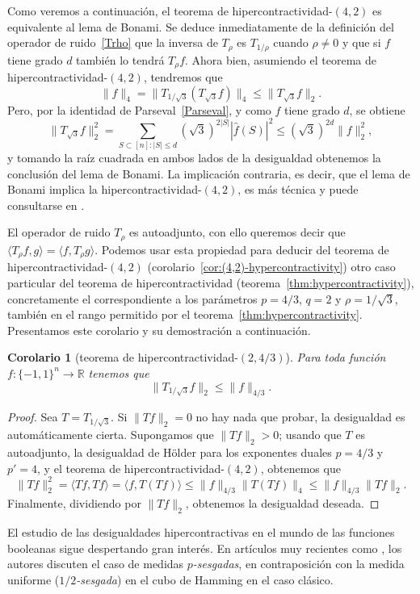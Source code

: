 \documentclass[autocontact]{gaceta}
\newcommand{\R}{\mathbb{R}}
\newtheorem{corollary}{Corolario}
\begin{document}
Como veremos a continuación, el teorema de hipercontractividad-$(4,2)$ es equivalente al lema de Bonami. Se deduce inmediatamente de la definición del operador de ruido~\eqref{Trho} que la inversa de $T_{\rho}$ es $T_{1/\rho}$ cuando $\rho\neq 0$ y que si $f$ tiene grado $d$ también lo tendrá $T_{\rho}f$. Ahora bien, asumiendo el teorema de hipercontractividad-$(4,2)$, tendremos que
\[
\|f\|_4=\|T_{1/\sqrt{3}}(T_{\sqrt{3}}f)\|_4\leq \|T_{\sqrt{3}}f\|_2.
\]
Pero, por la identidad de Parseval~\eqref{Parseval}, y como $f$ tiene grado $d$, se obtiene
\[
   \|T_{\sqrt{3}}f\|_2^2
   = \sum_{S\subset [n] \colon |S|\leq d} (\sqrt{3})^{2|S|}|\widehat{f}(S)|^2
   \leq (\sqrt{3})^{2d}\|f\|_2^2,
\]
y tomando la raíz cuadrada en ambos lados de la desigualdad obtenemos la conclusión del lema de Bonami. La implicación contraria, es decir, que el lema de Bonami implica la hipercontractividad-$(4,2)$, es más técnica y puede consultarse en \cite[teorema 9.21 y ejercicio 9.6]{O'Do21}.

El operador de ruido $T_{\rho}$ es autoadjunto, con ello queremos decir que $\langle T_{\rho}f,g\rangle=\langle f,T_{\rho}g\rangle$. Podemos usar esta propiedad para deducir del teorema de hi\-per\-con\-trac\-ti\-vi\-dad-$(4, 2)$ (corolario~\ref{cor:(4,2)-hypercontractivity}) otro caso particular del teorema de hipercontractividad (teorema~\ref{thm:hypercontractivity}), concretamente el correspondiente a los parámetros $p=4/3$, $q=2$ y $\rho=1/\sqrt{3}$, también en el rango permitido por el teorema~\ref{thm:hypercontractivity}. Presentamos este corolario y su demostración a continuación.

\begin{corollary}[teorema de hipercontractividad-$(2,4/3)$]
Para toda función $f:\{-1,1\}^n\to \R$ tenemos que
\[
\| T_{1/\sqrt{3}}f\|_2\leq \|f\|_{4/3}.
\]
\end{corollary}

\begin{proof}
Sea $T=T_{1/\sqrt{3}}$. Si $\|Tf\|_2=0$ no hay nada que probar, la desigualdad es automáticamente cierta. Supongamos que $\|Tf\|_2>0$;
usando que $T$ es autoadjunto, la desigualdad de Hölder para los exponentes duales $p=4/3$ y $p'=4$, y el teorema de hipercontractividad-$(4,2)$, obtenemos que
\[
   \|Tf\|_2^2 = \langle Tf,Tf\rangle = \langle f,T(Tf)\rangle
     \leq \|f\|_{4/3}\|T(Tf)\|_4 \leq \|f\|_{4/3}\|Tf\|_2.
\]
Finalmente, dividiendo por $\|Tf\|_2$, obtenemos la desigualdad deseada.
\end{proof}

El estudio de las desigualdades hipercontractivas en el mundo de las funciones booleanas sigue despertando gran interés. En artículos muy recientes como \cite{KLLM24}, los autores discuten el caso de medidas \emph{$p$-sesgadas}, en contraposición con la medida uniforme (\emph{$1/2$-sesgada}) en el cubo de Hamming en el caso clásico.
\end{document}
